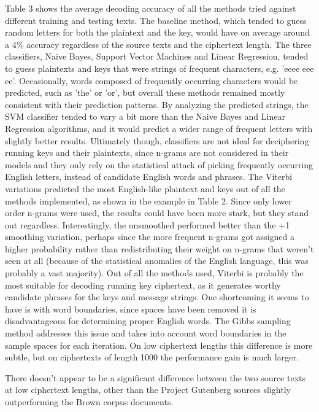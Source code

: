 \documentclass[11pt,letterpaper]{article}
\begin{document}
Table 3 shows the average decoding accuracy of all the methods tried against different training and testing texts. The baseline method, which tended to guess random letters for both the plaintext and the key, would have on average around a 4\% accuracy regardless of the source texts and the ciphertext length. The three classifiers, Naive Bayes, Support Vector Machines and Linear Regression, tended to guess plaintexts and keys that were strings of frequent characters, e.g. 'eeee eee ee'. Occasionally, words composed of frequently occurring characters would be predicted, such as 'the' or 'or', but overall these methods remained mostly consistent with their prediction patterns. By analyzing the predicted strings, the SVM classifier tended to vary a bit more than the Naive Bayes and Linear Regression algorithms, and it would predict a wider range of frequent letters with slightly better results. Ultimately though, classifiers are not ideal for deciphering running keys and their plaintexts, since n-grams are not considered in their models and they only rely on the statistical attack of picking frequently occurring English letters, instead of candidate English words and phrases.
The Viterbi variations predicted the most English-like plaintext and keys out of all the methods implemented, as shown in the example in Table 2. Since only lower order n-grams were used, the results could have been more stark, but they stand out regardless. Interestingly, the unsmoothed performed better than the +1 smoothing variation, perhaps since the more frequent n-grams got assigned a higher probability rather than redistributing their weight on n-grams that weren't seen at all (because of the statistical anomalies of the English language, this was probably a vast majority). Out of all the methods used, Viterbi is probably the most suitable for decoding running key ciphertext, as it generates worthy candidate phrases for the keys and message strings. One shortcoming it seems to have is with word boundaries, since spaces have been removed it is disadvantageous for determining proper English words. The Gibbs sampling method \cite{Reddy:12} addresses this issue and takes into account word boundaries in the sample spaces for each iteration. On low ciphertext lengths this difference is more subtle, but on ciphertexts of length 1000 the performance gain is much larger.

There doesn't appear to be a significant difference between the two source texts at low ciphertext lengths, other than the Project Gutenberg sources slightly outperforming the Brown corpus documents. 
\end{document}
